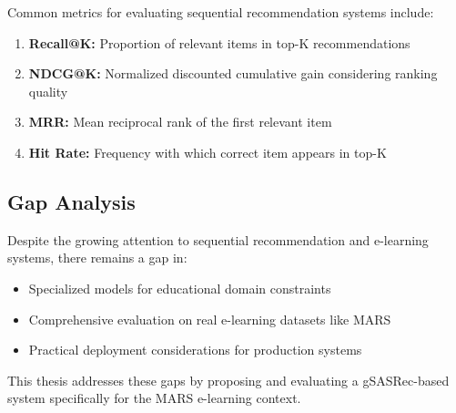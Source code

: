 Common metrics for evaluating sequential recommendation systems include:

\begin{enumerate}
    \item \textbf{Recall@K:} Proportion of relevant items in top-K recommendations
    \item \textbf{NDCG@K:} Normalized discounted cumulative gain considering ranking quality
    \item \textbf{MRR:} Mean reciprocal rank of the first relevant item
    \item \textbf{Hit Rate:} Frequency with which correct item appears in top-K
\end{enumerate}

\subsection{Gap Analysis}

Despite the growing attention to sequential recommendation and e-learning systems, there remains a gap in:

\begin{itemize}
    \item Specialized models for educational domain constraints
    \item Comprehensive evaluation on real e-learning datasets like MARS
    \item Practical deployment considerations for production systems
\end{itemize}

This thesis addresses these gaps by proposing and evaluating a gSASRec-based system specifically for the MARS e-learning context.

\newpage
